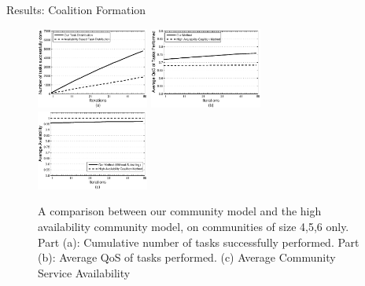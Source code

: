 \documentclass{beamer}
\begin{document}
\begin{frame}{Results: Coalition Formation}
    \begin{figure}[!t]
        \centering
        \includegraphics[width=1.45in]{figures/avg_task_ws_done.eps}
        \includegraphics[width=1.45in]{figures/avg_qos_ws_done.eps}
        \includegraphics[width=1.45in]{figures/avg_avail_ws_done.eps}
        \caption{A comparison between our community model and the high availability community model, on communities of size 4,5,6 only. Part (a): Cumulative number of tasks successfully performed. Part
        (b): Average QoS of tasks performed. (c) Average Community Service Availability} \label{fig_avail_method}
    \end{figure}
\end{frame}
\end{document}
